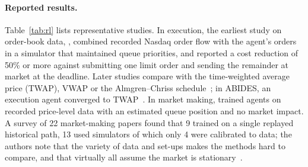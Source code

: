 \paragraph{Reported results.} Table~\ref{tab:rl} lists representative studies. In execution, the earliest
study on order-book data, \citet{nevmyvaka2006}, combined recorded Nasdaq order flow with the agent's orders in a
simulator that maintained queue priorities, and reported a cost reduction of 50\% or more against submitting one
limit order and sending the remainder at market at the deadline. Later studies compare with the time-weighted average price (TWAP), VWAP or the
Almgren--Chriss schedule~\citep{almgren2001}; in ABIDES, an execution agent converged to TWAP~\citep{karpe2020}. In
market making, \citet{spooner2018} trained agents on recorded price-level data with an estimated queue position and
no market impact. A survey of 22 market-making papers found that 9 trained on a single replayed historical path, 13
used simulators of which only 4 were calibrated to data; the authors note that
the variety of data and set-ups makes the methods hard to compare, and that virtually all assume the market is
stationary~\citep{gasperov2021survey}.

